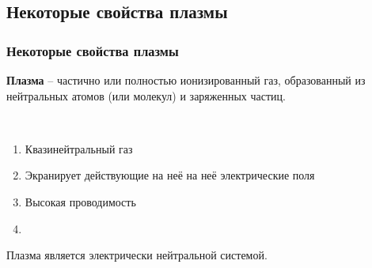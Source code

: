 \documentclass[10pt,pdf,hyperref={unicode}, dvipsnames]{beamer}
\begin{document}
\subsection{Некоторые свойства плазмы}
\begin{frame}
	\frametitle{Некоторые свойства плазмы}
	\textbf{Плазма} -- частично или полностью ионизированный газ, образованный из нейтральных атомов (или молекул) и заряженных частиц.

	$\,$
	\begin{enumerate}
		\item Квазинейтральный газ
		\item Экранирует действующие на неё на неё электрические поля
		\item Высокая проводимость
		\item 
	\end{enumerate}
	Плазма является электрически нейтральной системой.
\end{frame}
\end{document}
